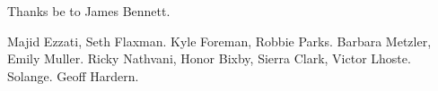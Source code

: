 Thanks be to James Bennett.

Majid Ezzati, Seth Flaxman.
Kyle Foreman, Robbie Parks.
Barbara Metzler, Emily Muller.
Ricky Nathvani, Honor Bixby, Sierra Clark, Victor Lhoste.
Solange.
Geoff Hardern.